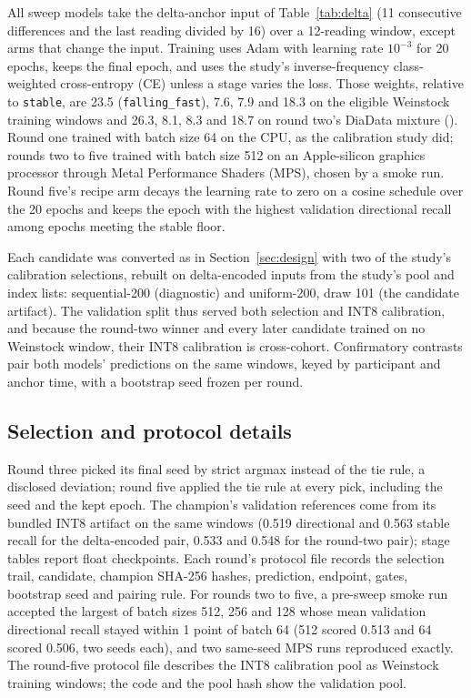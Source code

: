 \documentclass[10pt,twocolumn]{article}
\begin{document}
All sweep models take the delta-anchor input of Table~\ref{tab:delta} (11
consecutive differences and the last reading divided by 16) over a
12-reading window, except arms that change the input. Training uses Adam
with learning rate $10^{-3}$ for 20 epochs, keeps the final epoch, and
uses the study's inverse-frequency class-weighted cross-entropy (CE)
unless a stage varies the loss. Those weights, relative to
\texttt{stable}, are 23.5 (\texttt{falling\_fast}), 7.6, 7.9 and 18.3 on
the eligible Weinstock training windows and 26.3, 8.1, 8.3 and 18.7 on
round two's DiaData mixture (). Round one trained
with batch size 64 on the CPU, as the calibration study did; rounds two
to five trained with batch size 512 on an Apple-silicon graphics processor
through Metal Performance Shaders (MPS), chosen by a smoke run. Round
five's recipe arm decays the learning rate to zero on a cosine schedule
over the 20 epochs and keeps the epoch with the highest validation
directional recall among epochs meeting the stable floor.

Each candidate was converted as in Section~\ref{sec:design} with two of
the study's calibration selections, rebuilt on delta-encoded inputs from
the study's pool and index lists: sequential-200 (diagnostic) and
uniform-200, draw 101 (the candidate artifact). The validation split thus
served both selection and INT8 calibration, and because the round-two
winner and every later candidate trained on no Weinstock window, their
INT8 calibration is cross-cohort. Confirmatory contrasts pair both models'
predictions on the same windows, keyed by participant and anchor time,
with a bootstrap seed frozen per round.

\subsection{Selection and protocol details}

Round three picked its final seed by strict argmax instead of the tie
rule, a disclosed deviation; round five applied the tie rule at every
pick, including the seed and the kept epoch. The champion's validation
references come from its bundled INT8 artifact on the same windows (0.519
directional and 0.563 stable recall for the delta-encoded pair, 0.533 and
0.548 for the round-two pair); stage tables report float checkpoints.
Each round's protocol file records the selection trail, candidate,
champion SHA-256 hashes, prediction, endpoint, gates, bootstrap seed and
pairing rule. For rounds two to five, a pre-sweep smoke run accepted the
largest of batch sizes 512, 256 and 128 whose mean validation directional
recall stayed within 1 point of batch 64 (512 scored 0.513 and 64 scored
0.506, two seeds each), and two same-seed MPS runs reproduced exactly.
The round-five protocol file describes the INT8 calibration pool as
Weinstock training windows; the code and the pool hash show the
validation pool.
\end{document}
